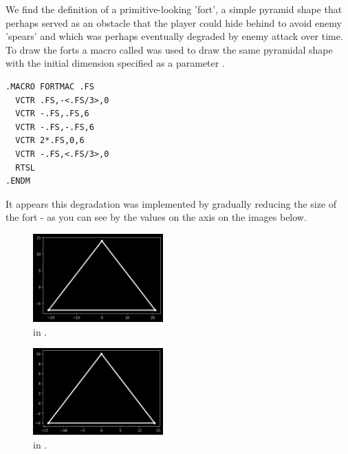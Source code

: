We find the definition of a primitive-looking 'fort', a simple pyramid shape that perhaps served as
an obstacle that the player could hide behind to avoid enemy 'spears' and which was perhaps eventually
degraded by enemy attack over time.  To draw the forts a macro called  was used to draw
the same pyramidal shape with the initial dimension specified as a parameter .
\clearpage
\begin{lstlisting}
.MACRO FORTMAC .FS
  VCTR .FS,-<.FS/3>,0
  VCTR -.FS,.FS,6
  VCTR -.FS,-.FS,6
  VCTR 2*.FS,0,6
  VCTR -.FS,<.FS/3>,0
  RTSL
.ENDM
\end{lstlisting}


It appears this degradation was implemented by gradually reducing the
size of the fort - as you can see by the values on the axis on the images below.

\begin{minipage}[c]{0.48\linewidth}
\begin{figure}[H]
    \centering
    \begin{adjustbox}{width=5.5cm,center}
        \includegraphics[width=5cm]{src/recreation/FORT1.png}%
    \end{adjustbox}
  \caption*{ in .}
\end{figure}
\end{minipage}
\begin{minipage}[c]{0.48\linewidth}
\begin{figure}[H]
    \centering
    \begin{adjustbox}{width=5.5cm,center}
        \includegraphics[width=5cm]{src/recreation/FORT3.png}%
    \end{adjustbox}
  \caption*{ in .}
\end{figure}
\end{minipage}

